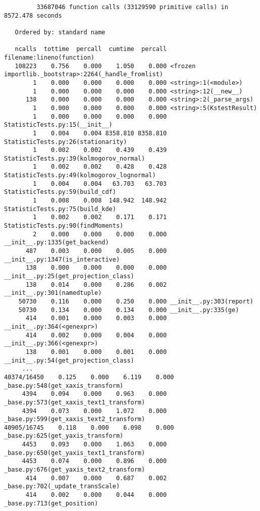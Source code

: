 \documentclass{article}
\begin{document}
\begin{verbatim}
         33687046 function calls (33129590 primitive calls) in 8572.478 seconds

   Ordered by: standard name

   ncalls  tottime  percall  cumtime  percall filename:lineno(function)
   108223    0.756    0.000    1.050    0.000 <frozen importlib._bootstrap>:2264(_handle_fromlist)
        1    0.000    0.000    0.000    0.000 <string>:1(<module>)
        1    0.000    0.000    0.000    0.000 <string>:12(__new__)
      138    0.000    0.000    0.000    0.000 <string>:2(_parse_args)
        1    0.000    0.000    0.000    0.000 <string>:5(KstestResult)
        1    0.000    0.000    0.000    0.000 StatisticTests.py:15(__init__)
        1    0.004    0.004 8358.810 8358.810 StatisticTests.py:26(stationarity)
        1    0.002    0.002    0.439    0.439 StatisticTests.py:39(kolmogorov_normal)
        1    0.002    0.002    0.428    0.428 StatisticTests.py:49(kolmogorov_lognormal)
        1    0.004    0.004   63.703   63.703 StatisticTests.py:59(build_cdf)
        1    0.008    0.008  148.942  148.942 StatisticTests.py:75(build_kde)
        1    0.002    0.002    0.171    0.171 StatisticTests.py:90(findMoments)
        2    0.000    0.000    0.000    0.000 __init__.py:1335(get_backend)
      487    0.003    0.000    0.005    0.000 __init__.py:1347(is_interactive)
      138    0.000    0.000    0.000    0.000 __init__.py:25(get_projection_class)
      138    0.014    0.000    0.286    0.002 __init__.py:301(namedtuple)
    50730    0.116    0.000    0.250    0.000 __init__.py:303(report)
    50730    0.134    0.000    0.134    0.000 __init__.py:335(ge)
      414    0.001    0.000    0.003    0.000 __init__.py:364(<genexpr>)
      414    0.002    0.000    0.004    0.000 __init__.py:366(<genexpr>)
      138    0.001    0.000    0.001    0.000 __init__.py:54(get_projection_class)
     ...
40374/16450    0.125    0.000    6.119    0.000 _base.py:548(get_xaxis_transform)
     4394    0.094    0.000    0.963    0.000 _base.py:573(get_xaxis_text1_transform)
     4394    0.073    0.000    1.072    0.000 _base.py:599(get_xaxis_text2_transform)
40905/16745    0.118    0.000    6.098    0.000 _base.py:625(get_yaxis_transform)
     4453    0.093    0.000    1.063    0.000 _base.py:650(get_yaxis_text1_transform)
     4453    0.074    0.000    0.896    0.000 _base.py:676(get_yaxis_text2_transform)
      414    0.007    0.000    0.687    0.002 _base.py:702(_update_transScale)
      414    0.002    0.000    0.044    0.000 _base.py:713(get_position)

\end{verbatim}
\end{document}
